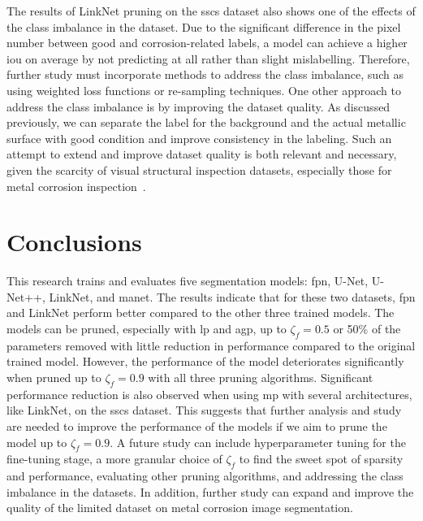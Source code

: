 \documentclass[mathematics,article,submit,pdftex,moreauthors]{Definitions/mdpi}
\begin{document}
The results of LinkNet pruning on the \ac{sscs} dataset
also shows one of the effects of the class imbalance in
the dataset. Due to the significant difference in the pixel
number between good and corrosion-related labels, 
a model can achieve a higher \ac{iou} on average by not 
predicting at all rather than slight mislabelling. Therefore,
further study must incorporate methods to address the class imbalance,
such as using weighted loss functions or re-sampling techniques.
One other approach to address the class imbalance is by improving
the dataset quality. As discussed previously, we can separate
the label for the background and the actual metallic surface with
good condition and improve consistency in the labeling. 
Such an attempt to extend and improve dataset quality is 
both relevant and necessary, given the scarcity
of visual structural inspection datasets, especially
those for metal corrosion inspection~\cite{Bianchi2022}. 

\section{Conclusions}
This research trains and evaluates five 
segmentation models: \ac{fpn}, U-Net, U-Net++, 
LinkNet, and \ac{manet}. The results indicate that for 
these two datasets, \ac{fpn} and LinkNet perform better compared to 
the other three trained models.
The models can be pruned, especially with \ac{lp}
and \ac{agp}, up to $\zeta_f=0.5$ or 50\% of 
the parameters removed with
little reduction in performance compared to
the original trained model. However,
the performance of the model deteriorates significantly
when pruned up to $\zeta_f=0.9$ with all three pruning
algorithms. Significant performance reduction is also
observed when using \ac{mp} with several architectures,
like LinkNet, on the \ac{sscs} dataset.
This suggests that further analysis
and study are needed to improve the performance
of the models if we aim to prune the model up to $\zeta_f=0.9$.
A future study can include hyperparameter tuning
for the fine-tuning stage, a more granular choice
of $\zeta_f$ to find the sweet spot of sparsity
and performance, evaluating other pruning algorithms,
and addressing the class imbalance in the datasets.
In addition, further study can expand
and improve the quality of the limited dataset on 
metal corrosion image segmentation.


\end{document}
